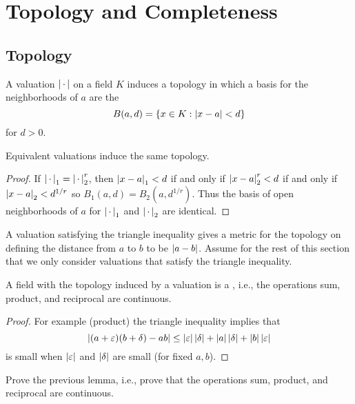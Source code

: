 \chapter{Topology and  Completeness}

\section{Topology}\label{sec:topology}
A valuation $\left|\,\cdot\,\right|$ on a field $K$ induces a topology in which a
basis for the neighborhoods of $a$ are the 
$$
  B(a,d) = \{x\in K : \left|x-a\right| < d\}
$$
for $d>0$.
\begin{lemma}
Equivalent valuations induce the same topology.
\end{lemma}
\begin{proof}
If $\left|\,\cdot\,\right|_1=\left|\,\cdot\,\right|_2^r$, then 
$\left|x-a\right|_1 < d$ if and only if
$\left|x-a\right|_2^r<d$ if and only if
$\left|x-a\right|_2<d^{1/r}$
so $B_1(a,d) = B_2(a,d^{1/r})$.
Thus the basis of open neighborhoods of $a$
for $\left|\,\cdot\,\right|_1$ and $\left|\,\cdot\,\right|_2$ are identical.
\end{proof}

A valuation satisfying the triangle inequality gives a metric for the
topology on defining the distance from $a$ to $b$ to be $\left|a-b\right|$.
Assume for the rest of this section that we only consider valuations
that satisfy the triangle inequality.
\begin{lemma}
A field with the topology induced by a valuation is
a , i.e., the operations sum, product, 
and reciprocal are continuous.
\end{lemma}
\begin{proof}
For example (product) the triangle inequality implies that
$$
  \left|(a+\varepsilon)(b+\delta) - ab\right|
   \leq \left|\varepsilon\right|\left|\delta\right| + \left|a\right|\left|\delta\right|
     + \left|b\right|\left|\varepsilon\right|
$$
     is small when $\left|\varepsilon\right|$ and $\left|\delta\right|$ are
small (for fixed $a, b$).
\end{proof}
\begin{exercise}\label{ex:topology1}
Prove the previous lemma, i.e., prove that the operations sum, product, 
and reciprocal are continuous.
\end{exercise}


